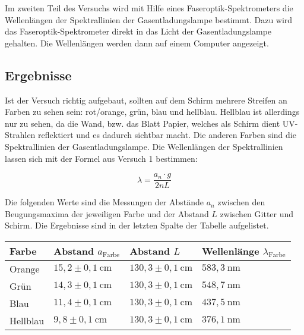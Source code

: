         Im zweiten Teil des Versuchs wird mit Hilfe eines Faseroptik-Spektrometers die Wellenlängen der Spektrallinien der Gasentladungslampe bestimmt. Dazu wird das Faseroptik-Spektrometer direkt in das Licht der Gasentladungslampe gehalten. Die Wellenlängen werden dann auf einem Computer angezeigt.
        
    \subsection{Ergebnisse}

        Ist der Versuch richtig aufgebaut, sollten auf dem Schirm mehrere Streifen an Farben zu sehen sein: rot/orange, grün, blau und \glqq hellblau\grqq. Hellblau ist allerdings nur zu sehen, da die Wand, bzw. das Blatt Papier, welches als Schirm dient UV-Strahlen reflektiert und es dadurch sichtbar macht. Die anderen Farben sind die Spektrallinien der Gasentladungslampe. Die Wellenlängen der Spektrallinien lassen sich mit der Formel aus Versuch 1 bestimmen:

        $$\lambda = \frac{a_{n} \cdot g}{2nL}$$

        Die folgenden Werte sind die Messungen der Abstände $a_{n}$ zwischen den Beugungsmaxima der jeweiligen Farbe und der Abstand $L$ zwischen Gitter und Schirm. Die Ergebnisse sind in der letzten Spalte der Tabelle aufgelistet.
        
        \begin{table}[H]
            \centering
            \begin{tabular}{|l|l|l|l|}
                \hline
                Farbe & Abstand $a_{\text{Farbe}}$ & Abstand $L$ & Wellenlänge $\lambda_{\text{Farbe}}$\\
                \hline
                Orange & $15,2 \pm 0,1\ \mathrm{cm}$ & $130,3 \pm 0,1\ \mathrm{cm}$ & $583,3\ \mathrm{nm}$\\
                \hline
                Grün & $14,3 \pm 0,1\ \mathrm{cm}$ & $130,3 \pm 0,1\ \mathrm{cm}$ & $548,7\ \mathrm{nm}$\\
                \hline
                Blau & $11,4 \pm 0,1\ \mathrm{cm}$ & $130,3 \pm 0,1\ \mathrm{cm}$ & $437,5\ \mathrm{nm}$\\
                \hline
                Hellblau & $9,8 \pm 0,1\ \mathrm{cm}$ & $130,3 \pm 0,1\ \mathrm{cm}$ & $376,1\ \mathrm{nm}$\\
                \hline
            \end{tabular}
        \end{table}

